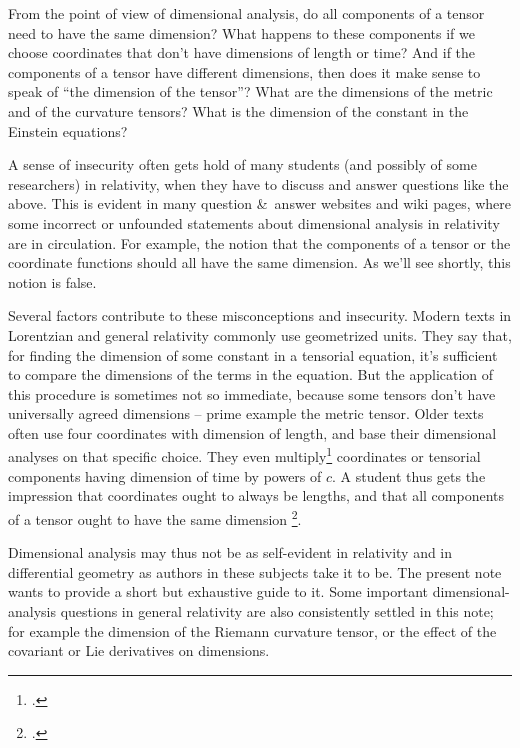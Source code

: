 \documentclass[a4paper,12pt,onecolumn,oneside,article,british]{memoir}
\newcommand*{\citep}{\footcites}
\newcommand*{\amp}{\&}
\newcommand*{\sect}{\S}%
\newcommand*{\eqn}{eq.}%
\newcommand*{\eg}{{e.g.}}
\begin{document}
From the point of view of dimensional analysis, do all components of a
tensor need to have the same dimension? What happens to these components if
we choose coordinates that don't have dimensions of length or time? And if
the components of a tensor have different dimensions, then does it make
sense to speak of \enquote{the dimension of the tensor}? What are the
dimensions of the metric and of the curvature tensors? What is the
dimension of the constant in the Einstein equations?

A sense of insecurity often gets hold of many students (and possibly of
some researchers) in relativity, when they have to discuss and answer
questions like the above. %
This is evident in many question \amp\ answer websites and wiki pages,
where some incorrect or unfounded statements about dimensional analysis in
relativity are in circulation. For example, the notion that the components
of a tensor or the coordinate functions should all have the same dimension.
As we'll see shortly, this notion is false.

Several factors contribute to these misconceptions and insecurity. Modern
texts in Lorentzian and general relativity commonly use geometrized units.
They say that, for finding the dimension of some constant in a tensorial
equation, it's sufficient to compare the dimensions of the terms in the
equation. But the application of this procedure is sometimes not so
immediate, because some tensors don't have universally agreed dimensions --
prime example the metric tensor. Older texts often use four coordinates
with dimension of length, and base their dimensional analyses on that
specific choice. They even multiply\citep[\eg][p.~71
\eqn~(37.1)]{tolman1934_t1949}[p.~80
\eqn~(32.15)]{landauetal1939_t1996}[p.~332
\eqn~(10.15)]{adleretal1965_r1975} coordinates or tensorial components
having dimension of time by powers of $c$. A student thus gets the
impression that coordinates ought to always be lengths, and that all
components of a tensor ought to have the same dimension \citep[A recent
work explicitly stating, if only in passing, that this needs not be the
case is][\sect~X]{kitano2013}.

\medskip

Dimensional analysis may thus not be as self-evident in relativity and in
differential geometry as authors in these subjects take it to be. The
present note wants to provide a short but exhaustive guide to it.
Some important dimensional-analysis questions in general relativity are
also consistently settled in this note; for example the dimension of the
Riemann curvature tensor, or the effect of the covariant or Lie derivatives
on dimensions.
\end{document}

